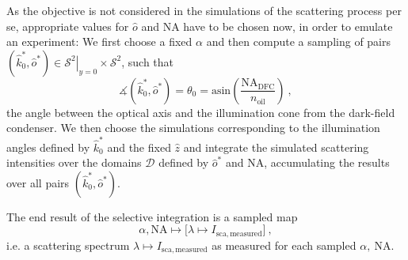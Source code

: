 \documentclass[10pt]{article}
\begin{document}

As the objective is not considered in the simulations of the scattering process per se, appropriate values for $\hat{o}$ and $\mathrm{NA}$ have to be chosen now, in order to emulate an experiment: 
We first choose a fixed $\alpha$ and then compute a sampling of pairs $\left( \hat{k}^*_0 , \hat{o}^* \right) \in \left. \mathcal{S}^2 \right\vert_{y=0} \times \mathcal{S}^2$, such that 
$$
    \measuredangle\!\left(\hat{k}^*_0 , \hat{o}^*\right) = \theta_0 = \mathrm{asin}\!\left( \frac{\mathrm{NA}_\mathrm{DFC}}{n_\mathrm{oil}} \right) \ , 
$$
the angle between the optical axis and the illumination cone from the dark-field condenser. 
We then choose the simulations corresponding to the illumination angles defined by $\hat{k}^*_0$ and the fixed $\hat{z}$ and integrate the simulated scattering intensities over the domains $\mathcal{D}$ defined by $\hat{o}^*$ and $\mathrm{NA}$, accumulating the results over all pairs $\left( \hat{k}^*_0 , \hat{o}^* \right)$.

The end result of the selective integration is a sampled map 
$$
    \alpha,\mathrm{NA} \mapsto \bigl[ \lambda \mapsto I_\mathrm{sca,measured} \bigr] \ ,
$$
i.e. a scattering spectrum $\lambda \mapsto I_\mathrm{sca,measured}$ as measured for each sampled $\alpha,\ \mathrm{NA}$. 

\end{document}
